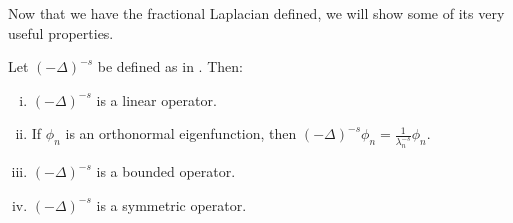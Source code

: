 \clearpage
Now that we have the fractional Laplacian defined, we will show some of its very useful properties.
\medskip
\begin{prop}\label{fracLaplacianProperties}
	Let $(-\Delta)^{-s}$ be defined as in . Then:
	\begin{enumerate}[(i)]
		\item 	$(-\Delta)^{-s}$ is a linear operator.\label{fracGausItem1}
		\item If $\phi_n$ is an orthonormal eigenfunction, then $(-\Delta)^{-s}\phi_n = \frac{1}{\lambda_{n}^{-s}}\phi_{n}$. \label{fracGausItem2}
		\item 	$(-\Delta)^{-s}$ is a bounded operator. \label{fracGausBounded}
		\item $(-\Delta)^{-s}$ is a symmetric operator. \label{fracGausSymmetric}
	\end{enumerate}
\end{prop}
